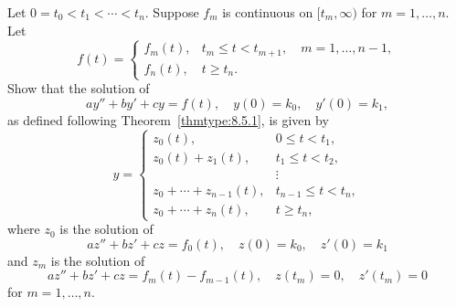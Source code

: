\documentclass{ximera}
\begin{document}
\begin{problem}\label{exer:8.5.26}
Let $0=t_0<t_1<\cdots <t_n$. Suppose $f_m$ is continuous
on $[t_m,\infty)$ for $m=1,\dots,n$.
 Let
$$
f(t)=
\left\{\begin{array}{cl}
f_m(t),&t_m\le t< t_{m+1},\quad m=1,\dots,n-1,\\
f_n(t),&t\ge t_n.
\end{array}\right.
$$
Show that the
solution of
$$
ay''+by'+cy=f(t), \quad  y(0)=k_0,\quad y'(0)=k_1,
$$
as defined following  Theorem~\ref{thmtype:8.5.1}, is given by
$$
y=\left\{\begin{array}{cl}
 z_0(t),&0\le t<t_1,\\ 
z_0(t)+ z_1(t),&t_1\le t<t_2,\\
&\vdots\\
z_0+\cdots+z_{n-1}(t),&t_{n-1}\le t<t_n,\\ 
z_0+\cdots+ z_n(t),&t\ge t_n,
\end{array}\right.
$$
where $z_0$ is the solution of
$$
az''+bz'+cz=f_0(t), \quad  z(0)=k_0,\quad  z'(0)=k_1
$$
and $z_m$ is the solution of
$$
az''+bz'+cz=f_m(t)-f_{m-1}(t), \quad  z(t_m)=0,\quad z'(t_m)=0
$$
for $m=1,\dots,n$.
\end{problem}
\end{document}
